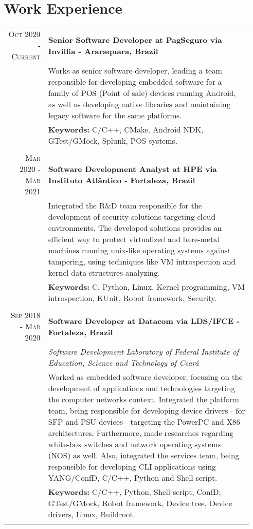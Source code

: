 \documentclass[a4paper,10pt]{article}
\begin{document}
\section{Work Experience}
\begin{tabular}{r|p{11cm}}

\textsc{Oct 2020 - Current} &\textbf{Senior Software Developer at PagSeguro via Invillia - Araraquara, Brazil} \\&\footnotesize{Works as senior software developer, leading a team responsible for developing embedded software for a family of POS (Point of sale) devices running Android, as well as developing native libraries and maintaining legacy software for the same platforms.}
\\ & \footnotesize{\textbf{Keywords:} C/C++, CMake, Android NDK, GTest/GMock, Splunk, POS systems.}
\\\multicolumn{2}{c}{} \\

\textsc{Mar 2020 - Mar 2021} &\textbf{Software Development Analyst at HPE via Instituto Atlântico - Fortaleza, Brazil} \\&\footnotesize{Integrated the R\&D team responsible for the development of security solutions targeting cloud environments. The developed solutions provides an efficient way to protect virtualized and bare-metal machines running unix-like operating systems against tampering, using techniques like VM introspection and kernel data structures analyzing.}
\\ & \footnotesize{\textbf{Keywords:} C, Python, Linux, Kernel programming, VM introspection, KUnit, Robot framework, Security.}
\\\multicolumn{2}{c}{} \\

\textsc{Sep 2018 - Mar 2020} &\textbf{Software Developer at Datacom via LDS/IFCE - Fortaleza, Brazil} \\&\emph{Software Development Laboratory of Federal Institute of Education, Science
and Technology of Ceará}\\&\footnotesize{Worked as embedded software developer, focusing on the development of applications and technologies targeting the computer networks context. Integrated the platform team, being responsible for developing device drivers - for SFP and PSU devices - targeting the PowerPC and X86 architectures. Furthermore,  made researches regarding white-box switches and network operating systems (NOS) as well.
Also, integrated the services team, being responsible for developing CLI applications using YANG/ConfD, C/C++, Python and Shell script.}
\\ & \footnotesize{\textbf{Keywords:} C/C++, Python, Shell script, ConfD,  GTest/GMock, Robot framework, Device tree, Device drivers, Linux, Buildroot.}
\\\multicolumn{2}{c}{} \\


\end{tabular}
\end{document}
